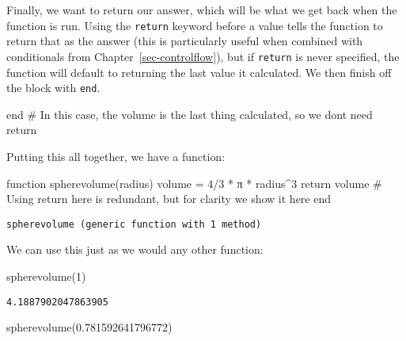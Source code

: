 \documentclass[
  letterpaper,
  DIV=11,
  numbers=noendperiod]{scrreprt}
\newenvironment{Shaded}{\begin{snugshade}}{\end{snugshade}}
\newcommand{\CommentTok}[1]{\textcolor[rgb]{0.37,0.37,0.37}{#1}}
\newcommand{\ConstantTok}[1]{\textcolor[rgb]{0.56,0.35,0.01}{#1}}
\newcommand{\ControlFlowTok}[1]{\textcolor[rgb]{0.00,0.23,0.31}{#1}}
\newcommand{\FloatTok}[1]{\textcolor[rgb]{0.68,0.00,0.00}{#1}}
\newcommand{\FunctionTok}[1]{\textcolor[rgb]{0.28,0.35,0.67}{#1}}
\newcommand{\KeywordTok}[1]{\textcolor[rgb]{0.00,0.23,0.31}{#1}}
\newcommand{\NormalTok}[1]{\textcolor[rgb]{0.00,0.23,0.31}{#1}}
\newcommand{\OperatorTok}[1]{\textcolor[rgb]{0.37,0.37,0.37}{#1}}
\begin{document}
Finally, we want to return our answer, which will be what we get back
when the function is run. Using the \texttt{return} keyword before a
value tells the function to return that as the answer (this is
particularly useful when combined with conditionals from
Chapter~\ref{sec-controlflow}), but if \texttt{return} is never
specified, the function will default to returning the last value it
calculated. We then finish off the block with \texttt{end}.

\begin{Shaded}
\begin{Highlighting}[]
\KeywordTok{end} \CommentTok{\# In this case, the volume is the last thing calculated, so we don\textquotesingle{}t need \textasciigrave{}return\textasciigrave{}}
\end{Highlighting}
\end{Shaded}

Putting this all together, we have a function:

\begin{Shaded}
\begin{Highlighting}[]
\KeywordTok{function} \FunctionTok{spherevolume}\NormalTok{(radius)}
\NormalTok{    volume }\OperatorTok{=} \FloatTok{4}\OperatorTok{/}\FloatTok{3} \OperatorTok{*} \ConstantTok{π} \OperatorTok{*}\NormalTok{ radius}\OperatorTok{\^{}}\FloatTok{3}
    \ControlFlowTok{return}\NormalTok{ volume }\CommentTok{\# Using \textasciigrave{}return\textasciigrave{} here is redundant, but for clarity we show it here}
\KeywordTok{end}
\end{Highlighting}
\end{Shaded}

\begin{verbatim}
spherevolume (generic function with 1 method)
\end{verbatim}

We can use this just as we would any other function:

\begin{Shaded}
\begin{Highlighting}[]
\FunctionTok{spherevolume}\NormalTok{(}\FloatTok{1}\NormalTok{)}
\end{Highlighting}
\end{Shaded}

\begin{verbatim}
4.1887902047863905
\end{verbatim}

\begin{Shaded}
\begin{Highlighting}[]
\FunctionTok{spherevolume}\NormalTok{(}\FloatTok{0.781592641796772}\NormalTok{)}
\end{Highlighting}
\end{Shaded}
\end{document}

